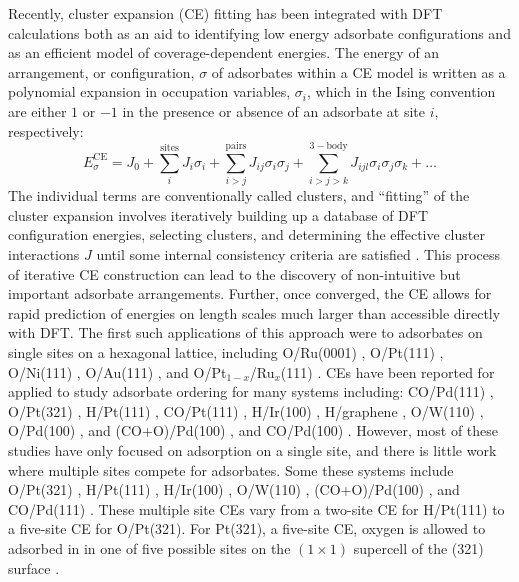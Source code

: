 \documentclass[11pt]{article}
\begin{document}
Recently, cluster expansion (CE) fitting has been integrated with DFT calculations both as an aid to identifying low energy adsorbate configurations and as an efficient model of coverage-dependent energies\cite{Stampfl1999,Tang2004, Han2005, Miller2009,Schmidt2012}. The energy of an arrangement, or configuration, $\sigma$ of adsorbates within a CE model is written as a polynomial expansion in occupation variables, $\sigma_i$, which in the Ising convention are either $1$ or $-1$ in the presence or absence of an adsorbate at site $i$, respectively:
\begin{equation} \label{CEeqn}
	E_\sigma^\mathrm{CE}=J_0+\sum^\mathrm{sites}_{i}J_i \sigma_i +\sum^\mathrm{pairs}_{i>j} J_{ij} \sigma_i \sigma_j + \sum^\mathrm{3-body}_{i>j>k} J_{ijl} \sigma_i \sigma_j \sigma_k + \ldots
\end{equation}
The individual terms are conventionally called clusters, and ``fitting'' of the cluster expansion involves iteratively building up a database of DFT configuration energies, selecting clusters, and determining the effective cluster interactions $J$ until some internal consistency criteria are satisfied \cite{Bray2014, Lerch2009, Bray2013b}. %
This process of iterative CE construction can lead to the discovery of non-intuitive but important adsorbate arrangements.  Further, once converged, the CE allows for rapid prediction of energies on length scales much larger than accessible directly with DFT.  The first such applications of this approach were to adsorbates on single sites on a hexagonal lattice, including O/Ru(0001) \cite{Stampfl1999,McEwen2002}, O/Pt(111) \cite{Tang2004,Schmidt2012, Miller2009, Miller2014}, O/Ni(111) \cite{Lazo2009}, O/Au(111) \cite{Miller2009}, and O/Pt$_{1-x}$/Ru$_x$(111) \cite{Han2005}.  CEs have been reported for applied to study adsorbate ordering for many systems including:   CO/Pd(111) \cite{Chen2012}, O/Pt(321) \cite{Bray2014},  H/Pt(111) \cite{Tan2013}, CO/Pt(111) \cite{Chen2012, Shan2009}, H/Ir(100) \cite{Lerch2008, Lerch2009}, H/graphene \cite{Sluiter2003}, O/W(110) \cite{Stohr2009}, O/Pd(100) \cite{Liu2013}, and (CO+O)/Pd(100) \cite{Liu2013}, and CO/Pd(100) \cite{Liu2004, Liu2013}.
However, most of these studies have only focused on adsorption on a single site, and there is little work where multiple sites compete for adsorbates. Some these systems include O/Pt(321) \cite{Bray2014}, H/Pt(111) \cite{Tan2013}, H/Ir(100) \cite{Lerch2008, Lerch2009}, O/W(110) \cite{Stohr2009}, (CO+O)/Pd(100) \cite{Liu2013}, and CO/Pd(111) \cite{Tan2013}. These multiple site CEs vary from a two-site CE for H/Pt(111) to a five-site CE for O/Pt(321). For Pt(321), a five-site CE, oxygen is allowed to adsorbed in in one of five possible sites on the $(1\times1)$ supercell of the (321) surface \cite{Bray2014}.
\end{document}
